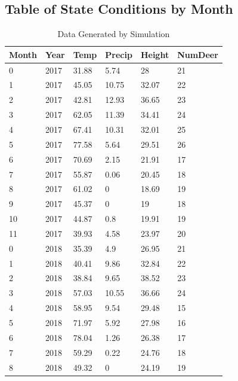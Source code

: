 \documentclass{article}
\begin{document}
\subsection{Table of State Conditions by Month}
\label{app:Data}

\begin{longtable}{|l|l|l|l|l|l|}
\caption{Data Generated by Simulation}\label{tab:Data}\\
\hline
Month & Year & Temp  & Precip & Height & NumDeer \\ \hline
0     & 2017 & 31.88 & 5.74   & 28     & 21      \\ \hline
1     & 2017 & 45.05 & 10.75  & 32.07  & 22      \\ \hline
2     & 2017 & 42.81 & 12.93  & 36.65  & 23      \\ \hline
3     & 2017 & 62.05 & 11.39  & 34.41  & 24      \\ \hline
4     & 2017 & 67.41 & 10.31  & 32.01  & 25      \\ \hline
5     & 2017 & 77.58 & 5.64   & 29.51  & 26      \\ \hline
6     & 2017 & 70.69 & 2.15   & 21.91  & 17      \\ \hline
7     & 2017 & 55.87 & 0.06   & 20.45  & 18      \\ \hline
8     & 2017 & 61.02 & 0      & 18.69  & 19      \\ \hline
9     & 2017 & 45.37 & 0      & 19     & 18      \\ \hline
10    & 2017 & 44.87 & 0.8    & 19.91  & 19      \\ \hline
11    & 2017 & 39.93 & 4.58   & 23.97  & 20      \\ \hline
0     & 2018 & 35.39 & 4.9    & 26.95  & 21      \\ \hline
1     & 2018 & 40.41 & 9.86   & 32.84  & 22      \\ \hline
2     & 2018 & 38.84 & 9.65   & 38.52  & 23      \\ \hline
3     & 2018 & 57.03 & 10.55  & 36.66  & 24      \\ \hline
4     & 2018 & 58.95 & 9.54   & 29.48  & 15      \\ \hline
5     & 2018 & 71.97 & 5.92   & 27.98  & 16      \\ \hline
6     & 2018 & 78.04 & 1.26   & 26.38  & 17      \\ \hline
7     & 2018 & 59.29 & 0.22   & 24.76  & 18      \\ \hline
8     & 2018 & 49.32 & 0      & 24.19  & 19      \\ \hline

\end{longtable}
\end{document}
